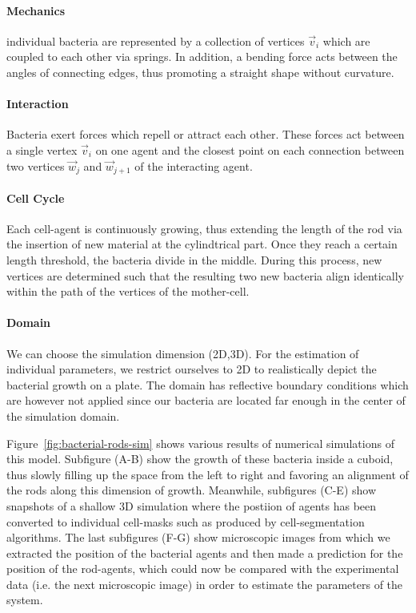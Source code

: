 \documentclass{article}
\begin{document}
\paragraph{Mechanics}
individual bacteria are represented by a collection of vertices $\vec{v}_i$ which are coupled to
each other via springs.
In addition, a bending force acts between the angles of connecting edges, thus promoting a straight
shape without curvature.
\paragraph{Interaction}
Bacteria exert forces which repell or attract each other.
These forces act between a single vertex $\vec{v}_i$ on one agent and the closest point on each
connection between two vertices $\vec{w}_j$ and $\vec{w}_{j+1}$ of the interacting agent.
\paragraph{Cell Cycle}
Each cell-agent is continuously growing, thus extending the length of the rod via the insertion of
new material at the cylindtrical part.
Once they reach a certain length threshold, the bacteria divide in the middle.
During this process, new vertices are determined such that the resulting two new bacteria align
identically within the path of the vertices of the mother-cell.
\paragraph{Domain}
We can choose the simulation dimension (2D,3D).
For the estimation of individual parameters, we restrict ourselves to 2D to realistically depict the
bacterial growth on a plate.
The domain has reflective boundary conditions which are however not applied since our bacteria are
located far enough in the center of the simulation domain.

Figure~\ref{fig:bacterial-rods-sim} shows various results of numerical simulations of this model.
Subfigure (A-B) show the growth of these bacteria inside a cuboid, thus slowly filling up the space
from the left to right and favoring an alignment of the rods along this dimension of growth.
Meanwhile, subfigures (C-E) show snapshots of a shallow 3D simulation where the postiion of agents
has been converted to individual cell-masks such as produced by cell-segmentation algorithms.
The last subfigures (F-G) show microscopic images from which we extracted the position of the
bacterial agents and then made a prediction for the position of the rod-agents, which could
now be compared with the experimental data (i.e. the next microscopic image) in order to estimate
the parameters of the system.
\end{document}
